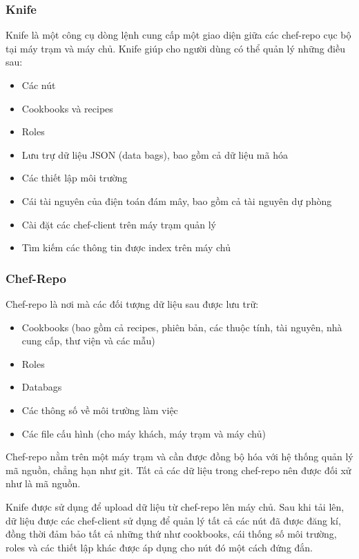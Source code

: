 \subsubsection{Knife}


Knife là một công cụ dòng lệnh cung cấp một giao diện giữa các chef-repo cục bộ tại máy trạm và máy chủ. Knife giúp cho người dùng có thể quản lý những điều sau:

\begin{itemize}
\item Các nút
\item Cookbooks và recipes
\item Roles
\item Lưu trự dữ liệu JSON (data bags), bao gồm cả dữ liệu mã hóa
\item Các thiết lập môi trường
\item Cái tài nguyên của điện toán đám mây, bao gồm cả tài nguyên dự phòng
\item Cài đặt các chef-client trên máy trạm quản lý
\item Tìm kiếm các thông tin được index trên máy chủ
\end{itemize}

\subsubsection{Chef-Repo}


Chef-repo là nơi mà các đối tượng dữ liệu sau được lưu trữ:

\begin{itemize}
\item Cookbooks (bao gồm cả recipes, phiên bản, các thuộc tính, tài nguyên, nhà cung cấp, thư viện và các mẫu)
\item Roles
\item Databags
\item Các thông số về môi trường làm việc
\item Các file cấu hình (cho máy khách, máy trạm và máy chủ)
\end{itemize}

Chef-repo nằm trên một máy trạm và cần được đồng bộ hóa với hệ thống quản lý mã nguồn, chẳng hạn như git. Tất cả các dữ liệu trong chef-repo nên được đối xử như là mã nguồn.

Knife được sử dụng để upload dữ liệu từ chef-repo lên máy chủ. Sau khi tải lên, dữ liệu được các chef-client sử dụng để quản lý tất cả các nút đã được đăng kí, đồng thời đảm bảo tất cả những thứ như cookbooks, cái thống số môi trường, roles và các thiết lập khác được áp dụng cho nút đó một cách đứng đắn.


